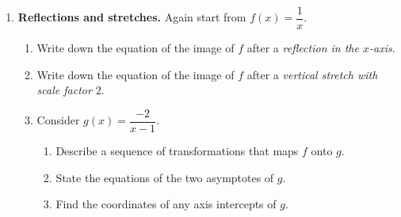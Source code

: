 \documentclass[12pt, twoside]{article}
\begin{document}
\begin{enumerate}[itemsep=0.4cm]
\begin{figure}[H]
\begin{center}
\end{center}
\end{figure}

\newpage

\item[2.] \textbf{Reflections and stretches.} Again start from $f(x)=\dfrac{1}{x}$.

\begin{enumerate}[label=(\alph*), itemsep=0.3cm]
  \item Write down the equation of the image of $f$ after a \emph{reflection in the
  $x$-axis}.

  \vspace{0.8cm}

  \item Write down the equation of the image of $f$ after a \emph{vertical stretch
  with scale factor $2$}.

  \vspace{0.8cm}

  \item Consider $\displaystyle g(x)=\dfrac{-2}{x-1}$.

  \begin{enumerate}[label=(\roman*), itemsep=0.2cm]
    \item Describe a sequence of transformations that maps $f$ onto $g$.

    \vspace{1.4cm}

    \item State the equations of the two asymptotes of $g$.

    \vspace{0.9cm}

    \item Find the coordinates of any axis intercepts of $g$.


\end{enumerate}
\end{enumerate}
\end{enumerate}
\end{document}
